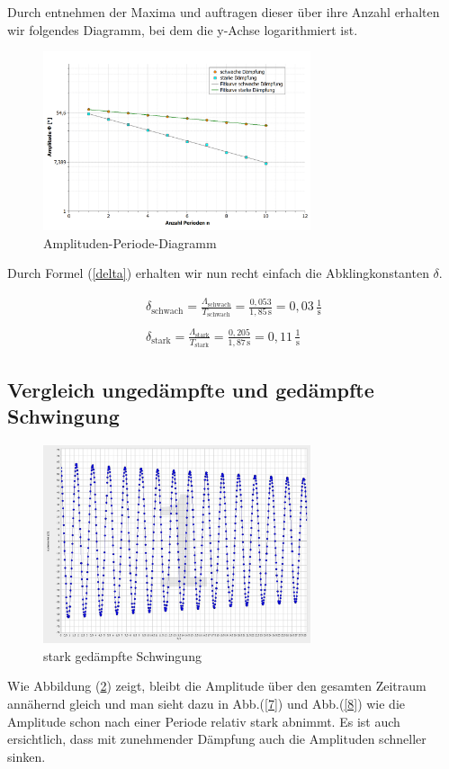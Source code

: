 \documentclass[fontsize=12pt]{scrartcl}
\begin{document}
Durch entnehmen der Maxima und auftragen dieser über ihre Anzahl erhalten wir folgendes Diagramm, bei dem die y-Achse logarithmiert ist.
\begin{figure}[H]
\centering
\vspace{-10pt}
                \includegraphics[width=0.7\textwidth]{Graphik/dek}
                \caption{Amplituden-Periode-Diagramm}
                \label{9}
\end{figure}
\vspace{-10pt}
Durch Formel (\ref{delta}) erhalten wir nun recht einfach die Abklingkonstanten $\delta$.

\begin{align*}
\delta_{\text{schwach}}  = \frac{\Lambda_{\text{schwach}}}{T_{\text{schwach}}}= \frac{0,053}{1,85\,\text{s}} = 0,03\,\frac{1}{\text{s}}\\
~\\
\delta_{\text{stark}} = \frac{\Lambda_{\text{stark}}}{T_{\text{stark}}} = \frac{0,205}{1,87\,\text{s}}=0,11\,\frac{1}{\text{s}}
\end{align*}

\subsection{Vergleich ungedämpfte und gedämpfte Schwingung}
\begin{figure}[H]
\centering
\vspace{-10pt}
                \includegraphics[width=0.7\textwidth]{Graphik/RobinGentiungedampft}
                \caption{stark gedämpfte Schwingung}
                \label{9}
\end{figure}
\vspace{-10pt}
Wie Abbildung (\ref{9}) zeigt, bleibt die Amplitude über den gesamten Zeitraum annähernd gleich und man sieht dazu in Abb.(\ref{7}) und Abb.(\ref{8}) wie die Amplitude schon nach einer Periode relativ stark abnimmt. Es ist auch ersichtlich, dass mit zunehmender Dämpfung auch die Amplituden schneller sinken.
\newpage
\end{document}
